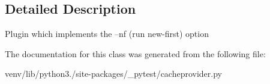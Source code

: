 \subsection{Detailed Description}
\begin{DoxyVerb}Plugin which implements the --nf (run new-first) option \end{DoxyVerb}
 

The documentation for this class was generated from the following file\+:\begin{DoxyCompactItemize}
\item 
venv/lib/python3./site-\/packages/\+\_\+pytest/cacheprovider.\+py\end{DoxyCompactItemize}
